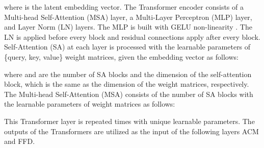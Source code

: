 \documentclass[letterpaper]{article} \usepackage{aaai23}  \usepackage{times}  \usepackage{helvet}  \usepackage{courier}  \usepackage[hyphens]{url}  \usepackage{graphicx} \urlstyle{rm} \def\UrlFont{\rm}  \usepackage{natbib}  \usepackage{caption} \frenchspacing  \setlength{\pdfpagewidth}{8.5in} \setlength{\pdfpageheight}{11in} \usepackage{algorithm}
\begin{document}
where  is the latent embedding vector.
The Transformer encoder consists of a Multi-head Self-Attention (MSA) layer, a Multi-Layer Perceptron (MLP) layer, and Layer Norm (LN) layers. The MLP is built with GELU non-linearity \cite{hendrycks2016gaussian}. The LN is applied before every block and residual connections apply after every block.
Self-Attention (SA) at each layer  is processed with the learnable parameters  of \{query, key, value\} weight matrices, given the embedding vector  as follows:

where  and  are the number of SA blocks and the dimension of the self-attention block, which is the same as the dimension of the weight matrices, respectively. 
The Multi-head Self-Attention (MSA) consists of the  number of SA blocks with the learnable parameters of weight
matrices  as follows:

This Transformer layer is repeated  times with unique learnable parameters. The outputs of the Transformers  are utilized as the input of the following layers ACM and FFD.
\end{document}
